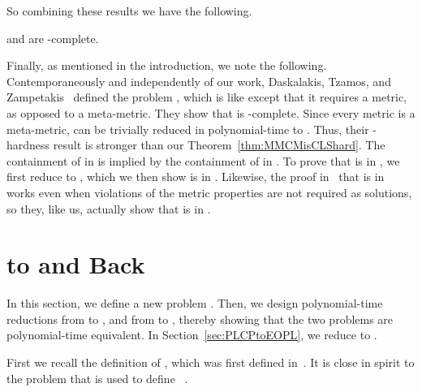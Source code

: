 So combining these results we have the following.

\begin{theorem}
\MMCM and \GCM are \CLS-complete.
\end{theorem}

Finally, as mentioned in the introduction, we note the following.
Contemporaneously and independently of our work, Daskalakis, Tzamos, and
Zampetakis~\cite{DTZ17} defined the problem \MBanach, which is like \MMCM except
that it requires a metric, as opposed to a meta-metric.  They show that \MBanach
is \CLS-complete.  Since every metric is a meta-metric, \MBanach can be
trivially reduced in polynomial-time to \MMCM. Thus, their \CLS-hardness result
is stronger than our Theorem~\ref{thm:MMCMisCLShard}.
The
containment of \MBanach in \CLS is implied by the containment of \MMCM in \CLS. 
To prove
that \MMCM is in \CLS, we first reduce to \GCM, which we then show is in \CLS.
Likewise, the proof in~\cite{DTZ17} that \MBanach is in \CLS works even when
violations of the metric properties are not required as solutions, so they, like
us, actually show that \GCM is in \CLS.

\section{\EOML to \EOPL and Back}
\label{sec:EOMLtoEOPL}

In this section, we define a new problem \EOPL.
Then, we design polynomial-time reductions from \EOML to \EOPL, and
from \EOPL to \EOML, thereby showing that the two problems 
are polynomial-time equivalent. In Section~\ref{sec:PLCPtoEOPL},
we reduce \PLCP to \EOPL.

First we recall the definition of \EOML, which was
first defined in~\cite{hubavcek2017hardness}.
It is close in spirit to the problem \EOL that is used
to define \PPAD~\cite{papadimitriou1994complexity}. 

